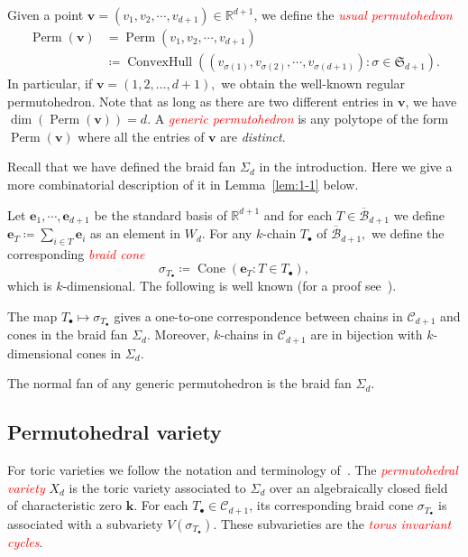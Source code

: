 \documentclass[ALCO,ThmDefs,Unicode,epreuves]{cedram}
\newcommand\R{{\mathbb R}}
\newcommand\fS{{\mathfrak S}}
\newcommand{\bm}[1]{{\boldsymbol{#1}}}
\newcommand\e{\bm{e}}
\renewcommand\v{\bm{v}}
\newcommand{\important}[1]{\emph{\textcolor{red}{#1}}}
\DeclareMathOperator{\conv}{ConvexHull}
\DeclareMathOperator{\cone}{Cone}
\DeclareMathOperator{\Perm}{Perm}
\renewcommand{\k}{\mathbf{k}}
\newcommand{\hB}{\overline{\mathcal B}}
\newcommand{\CC}{\mathcal{C}}
\begin{document}
\begin{defi}
	Given a point $\v = (v_1,v_2,\cdots,v_{d+1}) \in \R^{d+1}$, we define the \important{usual permutohedron}
	\[
\begin{aligned}	
	\Perm(\v) &= \Perm (v_1,v_2,\cdots, v_{d+1}) \\
	&\coloneqq \conv\left( \left(v_{\sigma(1)},v_{\sigma(2)},\cdots, v_{\sigma({d+1})}\right): \sigma\in \fS_{d+1}\right).
\end{aligned}	
	\]
	In particular, if $\v = (1, 2, \dots, {d+1}),$ we obtain the well-known regular permutohedron. %
	Note that as long as there are two different entries in $\v$, we have $\dim (\Perm(\v)) = d$. A \important{generic permutohedron} is any polytope of the form $\Perm(\v)$ where all the entries of $\v$ are \emph{distinct}.
\end{defi}



Recall that we have defined the braid fan $\Sigma_d$ in the introduction. Here we give a more combinatorial description of it in Lemma~\ref{lem:1-1} below.

Let $\e_1,\cdots,\e_{d+1}$ be the standard basis of $\R^{d+1}$ and for each $T\in \hB_{d+1}$ we define $\e_T\coloneqq \sum_{i\in T}\e_i$ as an element in $W_d$. For any $k$-chain $T_\bullet$ of $\hB_{d+1},$ we define the corresponding \important{braid cone}
\[\sigma_{T_\bullet}\coloneqq \cone(\e_T: T\in T_\bullet),\]
which is $k$-dimensional. The following is well known (for a proof see~\cite[Proposition~3.5]{nested}).
\begin{lemm}\label{lem:1-1}
	The map $T_\bullet \mapsto \sigma_{T_\bullet}$ gives a one-to-one correspondence between chains in $\CC_{d+1}$ and cones in the braid fan $\Sigma_d.$ Moreover, $k$-chains in $\CC_{d+1}$ are in bijection with $k$-dimensional cones in $\Sigma_d.$
	
	
\end{lemm}

\begin{lemm}\label{lem:generic}
	The normal fan of any generic permutohedron is the braid fan $\Sigma_d$. 
\end{lemm}



\subsection{Permutohedral variety}
For toric varieties we follow the notation and terminology of~\cite{fulton}. The \important{permutohedral variety} $X_d$ is the toric variety associated to $\Sigma_d$ over an algebraically closed field of characteristic zero $\k$. For each $T_\bullet\in\CC_{d+1}$, its corresponding braid cone $\sigma_{T_{\bullet}}$ is associated with a subvariety $V(\sigma_{T_{\bullet}})$. These subvarieties are the \important{torus invariant cycles}.
\end{document}
